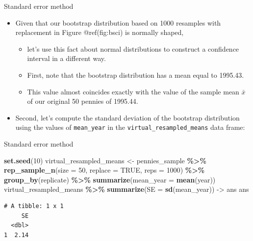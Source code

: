 \documentclass[
  ignorenonframetext,
]{beamer}
\newenvironment{Shaded}{\begin{snugshade}}{\end{snugshade}}
\newcommand{\AttributeTok}[1]{\textcolor[rgb]{0.13,0.29,0.53}{#1}}
\newcommand{\ConstantTok}[1]{\textcolor[rgb]{0.56,0.35,0.01}{#1}}
\newcommand{\DecValTok}[1]{\textcolor[rgb]{0.00,0.00,0.81}{#1}}
\newcommand{\FunctionTok}[1]{\textcolor[rgb]{0.13,0.29,0.53}{\textbf{#1}}}
\newcommand{\NormalTok}[1]{#1}
\newcommand{\OtherTok}[1]{\textcolor[rgb]{0.56,0.35,0.01}{#1}}
\newcommand{\SpecialCharTok}[1]{\textcolor[rgb]{0.81,0.36,0.00}{\textbf{#1}}}
\begin{document}
\begin{frame}[fragile]{Standard error method}
\label{standard-error-method}
\begin{itemize}
\item
  Given that our bootstrap distribution based on 1000 resamples with
  replacement in Figure @ref(fig:bsci) is normally shaped,

  \begin{itemize}
  \item
    let's use this fact about normal distributions to construct a
    confidence interval in a different way.
  \item
    First, note that the bootstrap distribution has a mean equal to
    1995.43.
  \item
    This value almost coincides exactly with the value of the sample
    mean \(\bar{x}\) of our original 50 pennies of 1995.44.
  \end{itemize}
\item
  Second, let's compute the standard deviation of the bootstrap
  distribution using the values of \texttt{mean\_year} in the
  \texttt{virtual\_resampled\_means} data frame:
\end{itemize}
\end{frame}

\begin{frame}[fragile]{Standard error method}
\label{standard-error-method-1}
\begin{Shaded}
\begin{Highlighting}[]
\FunctionTok{set.seed}\NormalTok{(}\DecValTok{10}\NormalTok{)}
\NormalTok{virtual\_resampled\_means }\OtherTok{\textless{}{-}}\NormalTok{ pennies\_sample }\SpecialCharTok{\%\textgreater{}\%} 
  \FunctionTok{rep\_sample\_n}\NormalTok{(}\AttributeTok{size =} \DecValTok{50}\NormalTok{, }\AttributeTok{replace =} \ConstantTok{TRUE}\NormalTok{, }\AttributeTok{reps =} \DecValTok{1000}\NormalTok{) }\SpecialCharTok{\%\textgreater{}\%} 
  \FunctionTok{group\_by}\NormalTok{(replicate) }\SpecialCharTok{\%\textgreater{}\%} 
  \FunctionTok{summarize}\NormalTok{(}\AttributeTok{mean\_year =} \FunctionTok{mean}\NormalTok{(year))}
\NormalTok{virtual\_resampled\_means }\SpecialCharTok{\%\textgreater{}\%} 
  \FunctionTok{summarize}\NormalTok{(}\AttributeTok{SE =} \FunctionTok{sd}\NormalTok{(mean\_year)) }\OtherTok{{-}\textgreater{}}\NormalTok{ ans}
\NormalTok{ans}
\end{Highlighting}
\end{Shaded}

\begin{verbatim}
# A tibble: 1 x 1
     SE
  <dbl>
1  2.14
\end{verbatim}
\end{frame}
\end{document}
